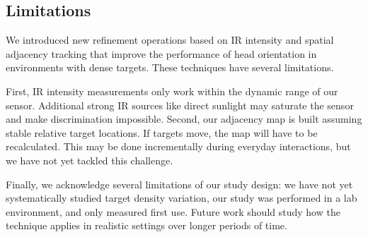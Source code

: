 
\subsection{Limitations}
We introduced new refinement operations based on IR intensity and spatial adjacency tracking that improve the performance of head orientation in environments with dense targets. These techniques have several limitations. 

First, IR intensity measurements only work within the dynamic range of our sensor. Additional strong IR sources like direct sunlight may saturate the sensor and make discrimination impossible. Second, our adjacency map is built assuming stable relative target locations. If targets move, the map will have to be recalculated. This may be done incrementally during everyday interactions, but we have not yet tackled this challenge. 

Finally, we acknowledge several limitations of our study design: we have not yet systematically studied target density variation, our study was performed in a lab environment, and only measured first use. Future work should study how the technique applies in realistic settings over longer periods of time.

